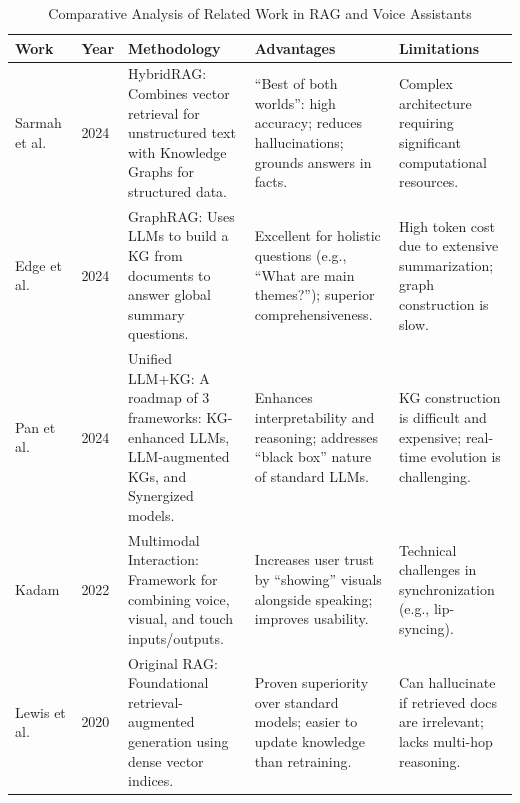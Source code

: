 \documentclass[12pt, a4paper]{article}
\begin{document}
\begin{table}[h!]
\centering
\caption{Comparative Analysis of Related Work in RAG and Voice Assistants}
\label{tab:related_work}
\renewcommand{\arraystretch}{1.35}
\begin{tabularx}{\textwidth}{@{}p{2.4cm} p{0.8cm} p{3.2cm} p{3.2cm} p{3.6cm}@{}}
\toprule
\textbf{Work} & \textbf{Year} & \textbf{Methodology} & \textbf{Advantages} & \textbf{Limitations} \\
\midrule
Sarmah et al.~\cite{sarmah2024hybridrag}
  & 2024
  & HybridRAG: Combines vector retrieval for unstructured text with Knowledge
    Graphs for structured data.
  & ``Best of both worlds'': high accuracy; reduces hallucinations; grounds
    answers in facts.
  & Complex architecture requiring significant computational resources. \\[4pt]

Edge et al.~\cite{edge2024graphrag}
  & 2024
  & GraphRAG: Uses LLMs to build a KG from documents to answer global summary
    questions.
  & Excellent for holistic questions (e.g., ``What are main themes?'');
    superior comprehensiveness.
  & High token cost due to extensive summarization; graph construction is
    slow. \\[4pt]

Pan et al.~\cite{pan2024unifying}
  & 2024
  & Unified LLM+KG: A roadmap of 3 frameworks: KG-enhanced LLMs,
    LLM-augmented KGs, and Synergized models.
  & Enhances interpretability and reasoning; addresses ``black box'' nature of
    standard LLMs.
  & KG construction is difficult and expensive; real-time evolution is
    challenging. \\[4pt]

Kadam~\cite{kadam2022multimodal}
  & 2022
  & Multimodal Interaction: Framework for combining voice, visual, and touch
    inputs/outputs.
  & Increases user trust by ``showing'' visuals alongside speaking; improves
    usability.
  & Technical challenges in synchronization (e.g., lip-syncing). \\[4pt]

Lewis et al.~\cite{lewis2020rag}
  & 2020
  & Original RAG: Foundational retrieval-augmented generation using dense
    vector indices.
  & Proven superiority over standard models; easier to update knowledge than
    retraining.
  & Can hallucinate if retrieved docs are irrelevant; lacks multi-hop
    reasoning. \\
\bottomrule
\end{tabularx}
\end{table}
\end{document}
